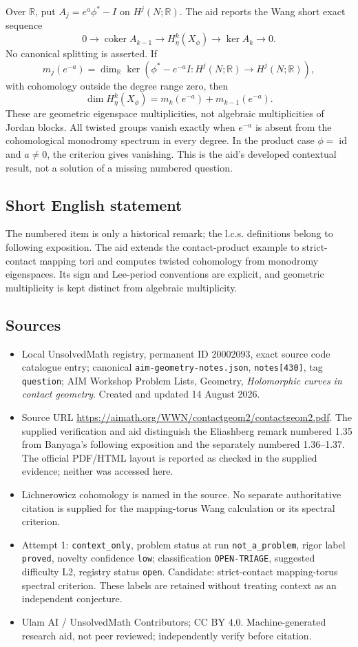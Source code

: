 \documentclass[11pt]{article}
\newcommand{\R}{\mathbb{R}}
\begin{document}
Over \(\R\), put \(A_j=e^a\phi^*-I\) on \(H^j(N;\R)\). The aid reports the Wang short exact sequence
\[
 0\longrightarrow\operatorname{coker}A_{k-1}
 \longrightarrow H_\eta^k(X_\phi)
 \longrightarrow\ker A_k\longrightarrow0.
\]
No canonical splitting is asserted. If
\[
 m_j(e^{-a})=\dim_\R\ker(\phi^*-e^{-a}I:H^j(N;\R)\to H^j(N;\R)),
\]
with cohomology outside the degree range zero, then
\[
 \dim H_\eta^k(X_\phi)=m_k(e^{-a})+m_{k-1}(e^{-a}).
\]
These are geometric eigenspace multiplicities, not algebraic multiplicities of Jordan blocks. All twisted groups vanish exactly when \(e^{-a}\) is absent from the cohomological monodromy spectrum in every degree. In the product case \(\phi=\operatorname{id}\) and \(a\ne0\), the criterion gives vanishing. This is the aid's developed contextual result, not a solution of a missing numbered question.
\subsection{Short English statement}
The numbered item is only a historical remark; the l.c.s. definitions belong to following exposition. The aid extends the contact-product example to strict-contact mapping tori and computes twisted cohomology from monodromy eigenspaces. Its sign and Lee-period conventions are explicit, and geometric multiplicity is kept distinct from algebraic multiplicity.
\subsection{Sources}
\begin{itemize}
\item Local UnsolvedMath registry, permanent ID 20002093, exact source code catalogue entry; canonical \texttt{aim-geometry-notes.json}, \texttt{notes[430]}, tag \texttt{question}; AIM Workshop Problem Lists, Geometry, \emph{Holomorphic curves in contact geometry}. Created and updated 14 August 2026.
\item Source URL \url{https://aimath.org/WWN/contactgeom2/contactgeom2.pdf}. The supplied verification and aid distinguish the Eliashberg remark numbered 1.35 from Banyaga's following exposition and the separately numbered 1.36--1.37. The official PDF/HTML layout is reported as checked in the supplied evidence; neither was accessed here.
\item Lichnerowicz cohomology is named in the source. No separate authoritative citation is supplied for the mapping-torus Wang calculation or its spectral criterion.
\item Attempt 1: \texttt{context\_only}, problem status at run \texttt{not\_a\_problem}, rigor label \texttt{proved}, novelty confidence \texttt{low}; classification \texttt{OPEN-TRIAGE}, suggested difficulty L2, registry status \texttt{open}. Candidate: strict-contact mapping-torus spectral criterion. These labels are retained without treating context as an independent conjecture.
\item Ulam AI / UnsolvedMath Contributors; CC BY 4.0. Machine-generated research aid, not peer reviewed; independently verify before citation.
\end{itemize}
\end{document}
